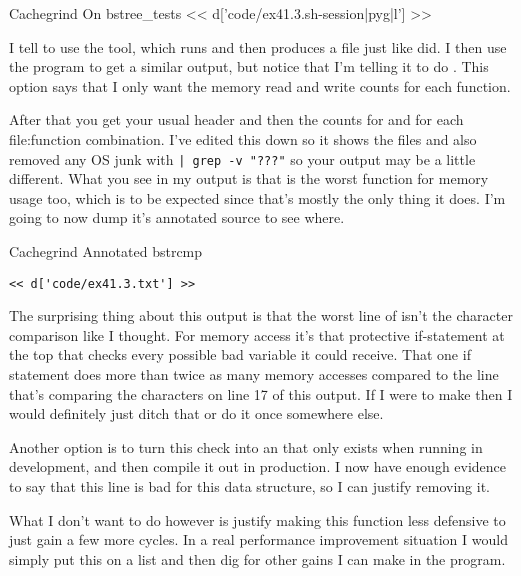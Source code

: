 \begin{code}{Cachegrind On bstree\_tests}
<< d['code/ex41.3.sh-session|pyg|l'] >>
\end{code}

I tell  to use the  tool, which runs
 and then produces a  file
just like  did.  I then use the program 
to get a similar output, but notice that I'm telling it to do .
This option says that I only want the memory read  and write 
counts for each function.

After that you get your usual header and then the counts for  and 
for each file:function combination.  I've edited this down so it shows the files
and also removed any OS junk with \verb,| grep -v "???", so your output may
be a little different.  What you see in my output is that  is the
worst function for memory usage too, which is to be expected since that's mostly
the only thing it does.  I'm going to now dump it's annotated source to
see where.

\begin{code}{Cachegrind Annotated bstrcmp}
\begin{Verbatim}
<< d['code/ex41.3.txt'] >>
\end{Verbatim}
\end{code}

The surprising thing about this output is that the worst line of 
isn't the character comparison like I thought.  For memory access it's that
protective if-statement at the top that checks every possible bad variable
it could receive.  That one if statement does more than twice as many memory
accesses compared to the line that's comparing the characters on line 17 of
this output.  If I were to make  then I would definitely just
ditch that or do it once somewhere else.

Another option is to turn this check into an  that only exists
when running in development, and then compile it out in production.  I now
have enough evidence to say that this line is bad for this data structure,
so I can justify removing it.

What I don't want to do however is justify making this function less defensive
to just gain a few more cycles.  In a real performance improvement situation I
would simply put this on a list and then dig for other gains I can make in
the program.

